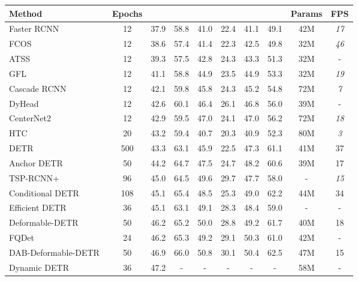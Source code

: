 \documentclass[10pt,twocolumn,letterpaper]{article}
\begin{document}
\begin{table*}[ht]
\centering
\begin{tabular}{@{}l@{\ }c@{\ \ \ \ }c@{\ \ \ \ }c@{\ \ \ \ }c@{\ \ \ \ }c@{\ \ \ \ }c@{\ \ \ \ }c@{\ \ \ }c@{\ \ \ }c@{}}
\toprule
Method       & Epochs &   &  &  &  &  &  & Params & FPS \\
\midrule
Faster RCNN~\cite{ren2015faster} & 12 & 37.9 & 58.8 & 41.0 & 22.4 & 41.1& 49.1 & 42M & \textit{17} \\
FCOS~\cite{tian2019fcos} & 12 & 38.6 & 57.4 & 41.4 & 22.3 & 42.5 & 49.8 & 32M & \textit{46} \\
ATSS~\cite{zhang2020bridging} & 12 & 39.3 & 57.5 & 42.8 & 24.3 & 43.3 & 51.3 & 32M & - \\  GFL~\cite{li2020generalizedv2} & 12 & 41.1 & 58.8 & 44.9 & 23.5 & 44.9 & 53.3 & 32M & \textit{19} \\
Cascade RCNN~\cite{cai2018cascade} & 12 & 42.1 & 59.8 & 45.8 & 24.3 & 45.2 & 54.8 & 72M & \textit{7} \\
DyHead~\cite{dai2021dynamic} & 12 & 42.6 & 60.1 & 46.4 & 26.1 & 46.8 & 56.0 & 39M & -\\
CenterNet2~\cite{zhou2021probablistic} & 12 & 42.9 &  59.5 & 47.0 & 24.1 & 47.0 & 56.2 & 72M & \textit{18} \\
HTC~\cite{chen2019hybrid} & 20 & 43.2 & 59.4 & 40.7 & 20.3 & 40.9 & 52.3 & 80M & \textit{3} \\
\midrule
DETR~\cite{carion2020end} & 500 & 43.3 & 63.1 & 45.9 & 22.5 & 47.3 & 61.1 & 41M & 37\\
Anchor DETR~\cite{wang2021anchor} & 50 & 44.2 & 64.7 & 47.5 & 24.7 & 48.2 & 60.6 & 39M & 17 \\
TSP-RCNN+~\cite{sun2020rethinking} & 96 & 45.0 & 64.5 & 49.6 & 29.7 & 47.7 & 58.0 & - & \textit{15} \\
Conditional DETR~\cite{meng2021conditional} & 108 & 45.1 & 65.4 & 48.5 & 25.3 & 49.0 & 62.2 & 44M & 34 \\
Efficient DETR~\cite{yao2021efficient} & 36 & 45.1 & 63.1 & 49.1 & 28.3 & 48.4 & 59.0 & - & -\\
Deformable-DETR~\cite{zhu2020deformable} & 50 & 46.2 & 65.2 & 50.0 & 28.8 & 49.2 & 61.7 & 40M & 18 \\
FQDet~\cite{picron2022fqdet} & 24 & 46.2 & 65.3 & 49.2 & 29.1 & 50.3 & 61.0 & 42M & - \\
DAB-Deformable-DETR~\cite{liu2022dab} & 50 & 46.9 & 66.0 & 50.8 & 30.1 & 50.4 & 62.5 & 47M & 15 \\
Dynamic DETR~\cite{dai2021dynamic} & 36 & 47.2 & - & - & - & - & - & 58M & - \\

\end{tabular}
\end{table*}
\end{document}
